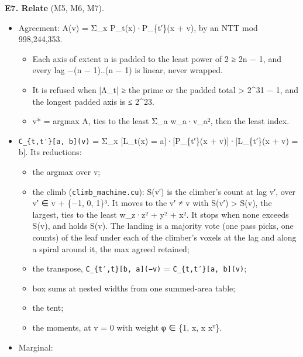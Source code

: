 \textbf{E7. Relate} (M5, M6, M7).

\begin{itemize}
\item Agreement: A(v) = Σ\_\allowbreak{}x P\_\allowbreak{}t(x)·P\_\allowbreak{}\{t′\}(x + v), by an NTT mod 998,244,353.

\begin{itemize}
\item Each axis of extent n is padded to the least power of 2 ≥ 2n − 1, and every lag −(n − 1)..(n − 1) is linear, never wrapped.
\item It is refused when |Λ\_\allowbreak{}t| ≥ the prime or the padded total > 2\textasciicircum{}31 − 1, and the longest padded axis is ≤ 2\textasciicircum{}23.
\item v* = argmax A, ties to the least Σ\_\allowbreak{}a w\_\allowbreak{}a·v\_\allowbreak{}a², then the least index.
\end{itemize}
\item \texttt{C\_\allowbreak{}\{t,t′\}[a, b](v)} = Σ\_\allowbreak{}x [L\_\allowbreak{}t(x) = a]·[P\_\allowbreak{}\{t′\}(x + v)]·[L\_\allowbreak{}\{t′\}(x + v) = b]. Its reductions:

\begin{itemize}
\item the argmax over v;
\item the climb (\texttt{climb\_\allowbreak{}machine.\allowbreak{}cu}): S(v′) is the climber's count at lag v′, over v′ ∈ v + \{−1, 0, 1\}³. It moves to the v′ ≠ v with S(v′) > S(v), the largest, ties to the least w\_\allowbreak{}z·z² + y² + x². It stops when none exceeds S(v), and holds S(v). The landing is a majority vote (one pass picks, one counts) of the leaf under each of the climber's voxels at the lag and along a spiral around it, the max agreed retained;
\item the transpose, \texttt{C\_\allowbreak{}\{t′,t\}[b, a](−v)} = \texttt{C\_\allowbreak{}\{t,t′\}[a, b](v)};
\item box sums at nested widths from one summed-area table;
\item the tent;
\item the moments, at v = 0 with weight φ ∈ \{1, x, x xᵀ\}.
\end{itemize}
\item Marginal:


\end{itemize}
